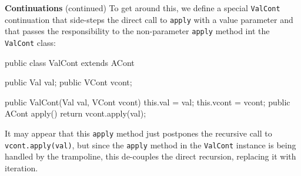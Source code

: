 \begin{minipage}[t]{\sw}
\slidenumber
\LARGE
{\bf Continuations} (continued)\exx
To get around this, we define a special \verb'ValCont' continuation
that side-steps the direct call to \verb'apply' with a value parameter
and that passes the responsibility
to the non-parameter \verb'apply' method int the \verb'ValCont' class:
\Large
\begin{qv}
public class ValCont extends ACont {

    public Val val;
    public VCont vcont;

    public ValCont(Val val, VCont vcont) {
        this.val = val;
        this.vcont = vcont;
    }
    public ACont apply() {
        return vcont.apply(val);
    }
}
\end{qv}
\LARGE
It may appear that this \verb'apply' method just postpones
the recursive call to \verb'vcont.apply(val)',
but since the \verb'apply' method in the \verb'ValCont' instance
is being handled by the trampoline,
this de-couples the direct recursion,
replacing it with iteration.
\end{minipage}
